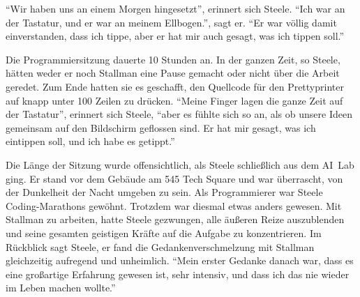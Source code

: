 "`Wir haben uns an einem Morgen hingesetzt"', erinnert sich Steele. "`Ich war an der Tastatur, und er war an meinem Ellbogen."', sagt er. "`Er war völlig damit einverstanden, dass ich tippe, aber er hat mir auch gesagt, was ich tippen soll."'

Die Programmiersitzung dauerte 10 Stunden an. In der ganzen Zeit, so Steele, hätten weder er noch Stallman eine Pause gemacht oder nicht über die Arbeit geredet. Zum Ende hatten sie es geschafft, den Quellcode für den Prettyprinter auf knapp unter 100 Zeilen zu drücken. "`Meine Finger lagen die ganze Zeit auf der Tastatur"', erinnert sich Steele, "`aber es fühlte sich so an, als ob unsere Ideen gemeinsam auf den Bildschirm geflossen sind. Er hat mir gesagt, was ich eintippen soll, und ich habe es getippt."'

Die Länge der Sitzung wurde offensichtlich, als Steele schließlich aus dem AI~Lab ging. Er stand vor dem Gebäude am 545 Tech Square und war überrascht, von der Dunkelheit der Nacht umgeben zu sein. Als Programmierer war Steele Coding-Marathons gewöhnt. Trotzdem war diesmal etwas anders gewesen. Mit Stallman zu arbeiten, hatte Steele gezwungen, alle äußeren Reize auszublenden und seine gesamten geistigen Kräfte auf die Aufgabe zu konzentrieren. Im Rückblick sagt Steele, er fand die Gedankenverschmelzung mit Stallman gleichzeitig aufregend und unheimlich. "`Mein erster Gedanke danach war, dass es eine großartige Erfahrung gewesen ist, sehr intensiv, und dass ich das nie wieder im Leben machen wollte."'
